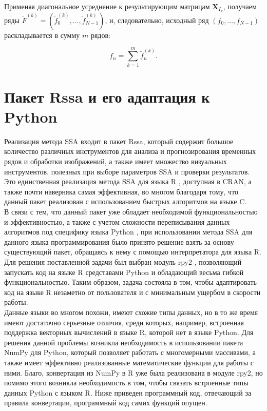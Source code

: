 \documentclass[specialist,
			   substylefile = spbu_report.rtx,
			   subf,href,colorlinks=true, 12pt]{disser}
\begin{document}
Применяя диагональное усреднение к результирующим матрицам $\mathbf{X}_{I_k}$, получаем ряды $\widetilde{F}^{(k)} = (\widetilde{f}_0^{(k)}, \dots, \widetilde{f}_{N - 1}^{(k)})$, и, следовательно, исходный ряд $(f_0, \dots, f_{N - 1})$ раскладывается в сумму $m$ рядов:
	
\begin{equation*}
	f_n = \sum\limits_{k=1}^{m} \widetilde{f}_n^{(k)}.
\end{equation*}

\chapter{Пакет Rssa и его адаптация к Python}

Реализация метода SSA входит в пакет Rssa, который содержит большое количество различных инструментов для анализа и прогнозирования временных рядов и обработки изображений, а также имеет множество визуальных инструментов, полезных при выборе параметров SSA и проверки результатов. Это единственная реализация метода SSA для языка R \cite{r-doc}, доступная в CRAN, а также почти наверняка самая эффективная, во многом благодаря тому, что данный пакет реализован с использованием быстрых алгоритмов на языке C.\\

В связи с тем, что данный пакет уже обладает необходимой функциональностью и эффективностью, а также с учетом сложности переписывания данных алгоритмов под специфику языка Python \cite{py-doc}, при использовании метода SSA для данного языка программирования было принято решение взять за основу существующий пакет, обращаясь к нему с помощью интерпретатора для языка R. Для решения поставленной задачи был выбран модуль rpy2 \cite{rpy-doc}, позволяющий запускать код на языке R средставами Python и обладающий весьма гибкой функциональностью. Таким образом, задача состояла в том, чтобы адаптировать код на языке R незаметно от пользователя и с минимальным ущербом в скорости работы.\\

Данные языки во многом похожи, имеют схожие типы данных, но в то же время имеют достаточно серьезные отличия, среди которых, например, встроенная поддержка векторных вычислений в языке R, которой нет в языке Python. Для решения данной проблемы возникла необходимость в использовании пакета NumPy для Python, который позволяет работать с многомерными массивами, а также имеет эффективно реализованные математические функции для работы с ними. Благо, конвертация из NumPy в R уже была реализована в модуле rpy2, но помимо этого возникла необходимость в том, чтобы связать встроенные типы данных Python с языком R. Ниже приведен программный код, отвечающий за правила конвертации, программный код самих функций опущен.\\
\end{document}
